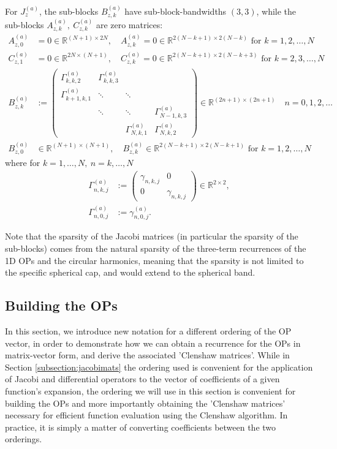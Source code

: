 \documentclass[11pt, oneside]{article}   	%
\newcommand{\R}{\mathbb{R}}
\newcommand{\gammaa}{\gamma^{(a)}}
\begin{document}
For $J_z^{(a)}$, the sub-blocks $B^{(a)}_{z,k}$ have sub-block-bandwidths $(3,3)$, while the sub-blocks $A^{(a)}_{z,k}, \: C^{(a)}_{z,k}$ are zero matrices:
\begin{align*}
	A^{(a)}_{z,0} &= 0 \in \R^{(N+1)\times2N}, \quad A^{(a)}_{z,k} = 0 \in \R^{2(N-k+1)\times2(N-k)} \text{ for } k = 1,2,\dots,N \\
	C^{(a)}_{z,1} &= 0 \in \R^{2N\times(N+1)}, \quad C^{(a)}_{z,k} = 0 \in \R^{2(N-k+1)\times2(N-k+3)} \text{ for } k = 2,3,\dots,N \\
	B^{(a)}_{z,k} &:= 
		\begin{pmatrix}
			\Gamma^{(a)}_{k,k,2} & \Gamma^{(a)}_{k,k,3} & \\
			\Gamma^{(a)}_{k+1,k,1} & \ddots & \ddots & \\
			& \ddots & \ddots & \Gamma^{(a)}_{N-1,k,3} \\
			& & \Gamma^{(a)}_{N,k,1} & \Gamma^{(a)}_{N,k,2}
		\end{pmatrix} \in \R^{(2n+1)\times(2n+1)}  \quad n = 0,1,2,\dots \\
	B^{(a)}_{z,0} &\in \R^{(N+1)\times(N+1)}, \quad B^{(a)}_{z,k} \in \R^{2(N-k+1)\times2(N-k+1)} \text{ for } k = 1,2,\dots,N
\end{align*}
where for $k = 1,\dots,N, \: n = k,\dots,N$
\begin{align*}
	\Gamma^{(a)}_{n,k,j} &:= 
		\begin{pmatrix}
			\gamma_{n,k,j} & 0 \\
			0 & \gamma_{n,k,j}
		\end{pmatrix} \in \R^{2\times2}, \\
	\Gamma^{(a)}_{n,0,j} &:= \gammaa_{n,0,j}.
\end{align*}

Note that the sparsity of the Jacobi matrices (in particular the sparsity of the sub-blocks) comes from the natural sparsity of the three-term recurrences of the 1D OPs and the circular harmonics, meaning that the sparsity is not limited to the specific spherical cap, and would extend to the spherical band.




\subsection{Building the OPs} 

In this section, we introduce new notation for a different ordering of the OP vector, in order to demonstrate how we can obtain a recurrence for the OPs in matrix-vector form, and derive the associated 'Clenshaw matrices'. While in Section \ref{subsection:jacobimats} the ordering used is convenient for the application of Jacobi and differential operators to the vector of coefficients of a given function's expansion, the ordering we will use in this section is convenient for building the OPs and more importantly obtaining the 'Clenshaw matrices' necessary for efficient function evaluation using the Clenshaw algorithm. In practice, it is simply a matter of converting coefficients between the two orderings.
\end{document}
